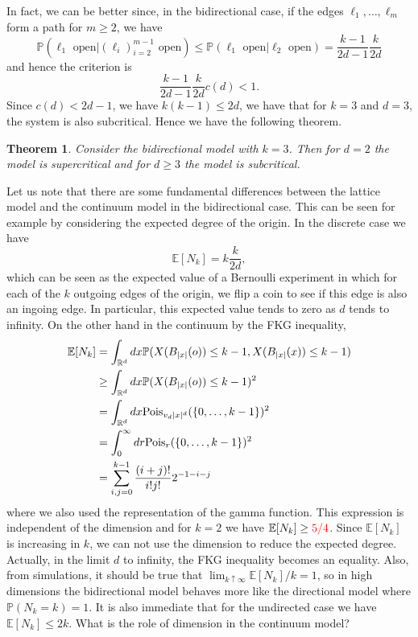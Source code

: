 \documentclass{article}
\newtheorem{theorem}{Theorem}[section]
\theoremstyle{definition}
\newcommand{\1}{\mathbbm{1}}
\newcommand{\0}{\mathbf{o}}
\begin{document}
In fact, we can be better since, in the bidirectional case, if the edges $\ell_1,\ldots,\ell_m$ form a path for $m \geq 2$, we have
$$
\mathbb P(\ell_1\text{ open}|(\ell_i)_{i=2}^{m-1} \text{ open})\le \mathbb P(\ell_1\text{ open}|\ell_2\text{ open})=\frac{k-1}{2d-1}\frac{k}{2d}
$$
and hence the criterion is
$$
\frac{k-1}{2d-1}\frac{k}{2d}c(d)<1.
$$
Since $c(d)<2d-1$, we have $k(k-1)\le 2d$, we have that for $k=3$ and $d=3$, the system is also subcritical. Hence we have the following theorem.
\begin{theorem}
Consider the bidirectional model with $k=3$. Then for $d=2$ the model is supercritical and for $d\ge 3$ the model is subcritical. 
\end{theorem}

Let us note that there are some fundamental differences between the lattice model and the continuum model in the bidirectional case. This can be seen for example by considering the expected degree of the origin. In the discrete case we have
$$
\mathbb E[N_k]=k\frac{k}{2d}, 
$$
which can be seen as the expected value of a Bernoulli experiment in which for each of the $k$ outgoing edges of the origin, we flip a coin to see if this edge is also an ingoing edge. In particular, this expected value tends to zero as $d$ tends to infinity. On the other hand in the continuum by the FKG inequality,
\begin{align*}
\mathbb E[N_k]&=\int_{\mathbb R^d}d x\mathbb P(X(B_{|x|}(o))\le k-1, X(B_{|x|}(x))\le k-1)\\
&\ge \int_{\mathbb R^d}d x\mathbb P(X(B_{|x|}(o))\le k-1)^2\\
&= \int_{\mathbb R^d}d x {\rm Pois}_{v_d|x|^d}(\{0,\dots,k-1\})^2\\
&= \int_0^\infty d r {\rm Pois}_{r}(\{0,\dots,k-1\})^2\\
&= \sum_{i,j=0}^{k-1}\frac{(i+j)!}{i!j!}2^{-1-i-j}
\end{align*}
where we also used the representation of the gamma function. This expression is independent of the dimension and for $k=2$ we have $\mathbb E[N_k]\ge \color{red} 5/4 \color{black}$. Since $\mathbb E[N_k]$ is increasing in $k$, we can not use the dimension to reduce the expected degree. Actually, in the limit $d$ to infinity, the FKG inequality becomes an equality. Also, from simulations, it should be true that $\lim_{k\uparrow\infty}\mathbb E[N_k]/k=1$, so in high dimensions the bidirectional model behaves more like the directional model where  $\mathbb P(N_k=k)=1$. It is also immediate that for the undirected case we have $\mathbb E[N_k]\le 2k$. What is the role of dimension in the continuum model?
\end{document}

